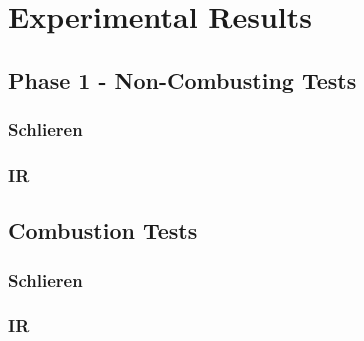 
\chapter{Experimental Results} %

\label{Chapter5} %



\section{Phase 1 - Non-Combusting Tests}




\subsection{Schlieren}


\subsection{IR}


\section{Combustion Tests}




\subsection{Schlieren}


\subsection{IR}


\newpage


